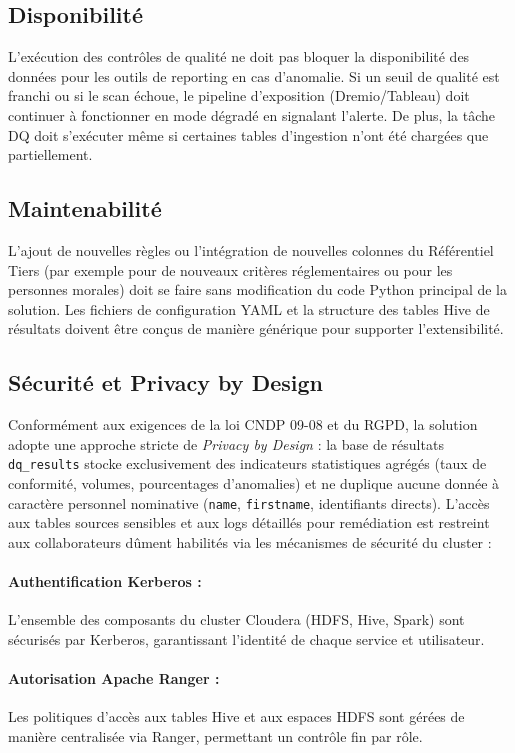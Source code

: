\subsection{Disponibilité}
L'exécution des contrôles de qualité ne doit pas bloquer la disponibilité des données pour les outils de reporting en cas d'anomalie. Si un seuil de qualité est franchi ou si le scan échoue, le pipeline d'exposition (Dremio/Tableau) doit continuer à fonctionner en mode dégradé en signalant l'alerte. De plus, la tâche DQ doit s'exécuter même si certaines tables d'ingestion n'ont été chargées que partiellement.

\subsection{Maintenabilité}
L'ajout de nouvelles règles ou l'intégration de nouvelles colonnes du Référentiel Tiers (par exemple pour de nouveaux critères réglementaires ou pour les personnes morales) doit se faire sans modification du code Python principal de la solution. Les fichiers de configuration YAML et la structure des tables Hive de résultats doivent être conçus de manière générique pour supporter l'extensibilité.

\subsection{Sécurité et Privacy by Design}
Conformément aux exigences de la loi CNDP 09-08 et du RGPD, la solution adopte une approche stricte de \textit{Privacy by Design} : la base de résultats \texttt{dq\_results} stocke exclusivement des indicateurs statistiques agrégés (taux de conformité, volumes, pourcentages d'anomalies) et ne duplique aucune donnée à caractère personnel nominative (\texttt{name}, \texttt{firstname}, identifiants directs). L'accès aux tables sources sensibles et aux logs détaillés pour remédiation est restreint aux collaborateurs dûment habilités via les mécanismes de sécurité du cluster :

\paragraph{Authentification Kerberos :} L'ensemble des composants du cluster Cloudera (HDFS, Hive, Spark) sont sécurisés par Kerberos, garantissant l'identité de chaque service et utilisateur.

\paragraph{Autorisation Apache Ranger :} Les politiques d'accès aux tables Hive et aux espaces HDFS sont gérées de manière centralisée via Ranger, permettant un contrôle fin par rôle.

